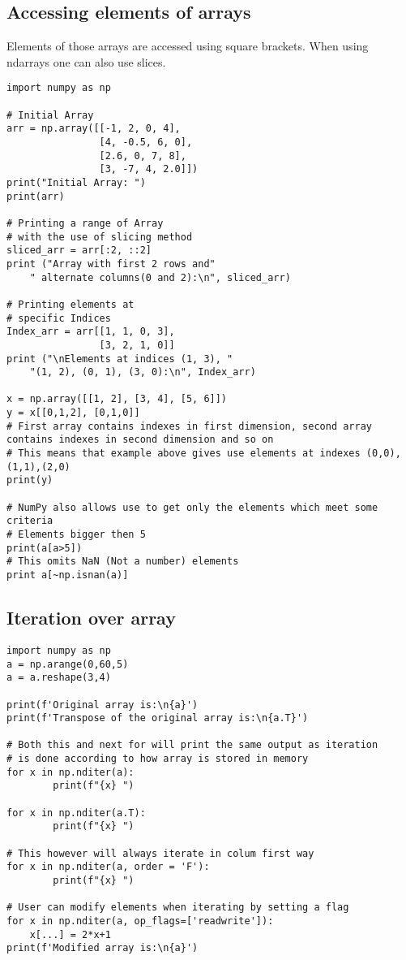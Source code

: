 \documentclass{article}
\begin{document}
\subsection{Accessing elements of arrays}
Elements of those arrays are accessed using square brackets.
When using ndarrays one can also use slices.
\begin{lstlisting}
import numpy as np

# Initial Array
arr = np.array([[-1, 2, 0, 4],
                [4, -0.5, 6, 0],
                [2.6, 0, 7, 8],
                [3, -7, 4, 2.0]])
print("Initial Array: ")
print(arr)
  
# Printing a range of Array
# with the use of slicing method
sliced_arr = arr[:2, ::2]
print ("Array with first 2 rows and"
    " alternate columns(0 and 2):\n", sliced_arr)

# Printing elements at
# specific Indices
Index_arr = arr[[1, 1, 0, 3],
                [3, 2, 1, 0]]
print ("\nElements at indices (1, 3), "
    "(1, 2), (0, 1), (3, 0):\n", Index_arr)

x = np.array([[1, 2], [3, 4], [5, 6]])
y = x[[0,1,2], [0,1,0]] 
# First array contains indexes in first dimension, second array contains indexes in second dimension and so on
# This means that example above gives use elements at indexes (0,0),(1,1),(2,0)
print(y)

# NumPy also allows use to get only the elements which meet some criteria
# Elements bigger then 5
print(a[a>5])
# This omits NaN (Not a number) elements
print a[~np.isnan(a)]
\end{lstlisting}
\subsection{Iteration over array}
\begin{lstlisting}
import numpy as np
a = np.arange(0,60,5)
a = a.reshape(3,4)

print(f'Original array is:\n{a}')
print(f'Transpose of the original array is:\n{a.T}')

# Both this and next for will print the same output as iteration
# is done according to how array is stored in memory
for x in np.nditer(a):
        print(f"{x} ")

for x in np.nditer(a.T):
        print(f"{x} ")

# This however will always iterate in colum first way
for x in np.nditer(a, order = 'F'):
        print(f"{x} ")

# User can modify elements when iterating by setting a flag
for x in np.nditer(a, op_flags=['readwrite']):
    x[...] = 2*x+1
print(f'Modified array is:\n{a}')
\end{lstlisting}
\end{document}
